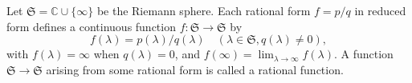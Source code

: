 Let $\mathfrak{S} = \mathbb{C} \cup \{\infty\}$ be the Riemann sphere. Each rational form $f = p/q$ in reduced form defines a continuous function $f: \mathfrak{S} \to \mathfrak{S}$ by
$$f(\lambda) = p(\lambda)/q(\lambda) \quad (\lambda \in \mathfrak{S}, q(\lambda) \neq 0),$$
with $f(\lambda) = \infty$ when $q(\lambda) = 0$, and $f(\infty) = \lim_{\lambda \to \infty} f(\lambda)$. A function $\mathfrak{S} \to \mathfrak{S}$ arising from some rational form is called a rational function.
